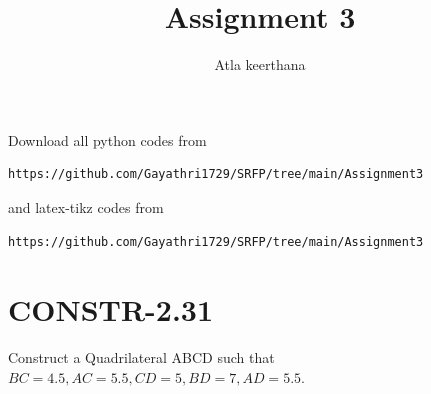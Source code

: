 \documentclass[journal,12pt,twocolumn]{IEEEtran}
\begin{document}
     \def\rightbox#1{\makebox[0in][r]{#1}}
     \def\centbox#1{\makebox[0in]{#1}}
     \def\topbox#1{\raisebox{-\baselineskip}[0in][0in]{#1}}
     \def\midbox#1{\raisebox{-0.5\baselineskip}[0in][0in]{#1}}
%
\title{Assignment 3} 
\author{Atla keerthana}
\maketitle
\newpage
\bigskip
\renewcommand{\thefigure}{\theenumi}
\renewcommand{\thetable}{\theenumi}
Download all python codes from 
\begin{lstlisting}
https://github.com/Gayathri1729/SRFP/tree/main/Assignment3
\end{lstlisting}
%
and latex-tikz codes from 
%
\begin{lstlisting}
https://github.com/Gayathri1729/SRFP/tree/main/Assignment3
\end{lstlisting}
%
\section{CONSTR-2.31}
Construct a Quadrilateral ABCD such that $BC =4.5,AC =5.5,CD =5,BD =7,AD=5.5$.
\end{document}
